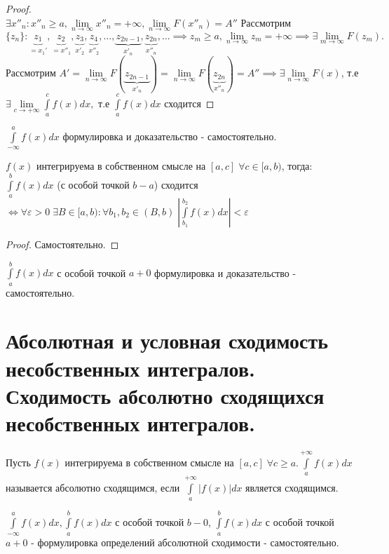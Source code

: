 \documentclass[../main.tex]{subfiles}
\begin{document}
\begin{proof}
    \\      $\exists x''_{n}: x''_{n}\geqslant a , \lim\limits_{n   \to \infty}x''_{n}=+\infty ,\lim\limits_{n  \to \infty}F(x''_{n})=A''$  Рассмотрим $\{z_{n}\}: \underbrace{z_{1}}_{=x_{1}'},\underbrace{z_{2}}_{=x''_{1}},\underbrace{z_{3}}_{x'_{2}},\underbrace{z_{4}}_{x''_{2}},\dots,\underbrace{z_{2n-1}}_{x'_{n}},\underbrace{z_{2n}}_{x''_{n}},\dots\implies z_{m}\geqslant a , \lim\limits_{n \to \infty}z_{m}=+\infty \implies \exists \lim\limits_{m    \to \infty}F(z_{m}).$ 
    Рассмотрим $A' =\lim\limits_{n  \to \infty}F(\underbrace{z_{2n-1}}_{x'_{n}})=\lim\limits_{n   \to \infty} F(\underbrace{z_{2n}}_{x''_{n}})=A'' \implies \exists \lim\limits_{n  \to \infty}F(x)$, т.е $\exists \lim\limits_{c   \to +\infty}\int\limits_{a  }^{c    } f(x)dx,$ т.е $\int\limits_{a  }^{c    } f(x)dx$ сходится
\end{proof}
$\int\limits_{-\infty   }^{a    } f(x)dx$ формулировка и доказательство - самостоятельно.
\begin{theorem}
    $f(x)$ интегрируема в собственном смысле на $[a,c]\; \forall c \in [a,b)$, тогда: $\int\limits_{a   }^{b    } f(x)dx$ (с особой точкой $b-a$) сходится $\Leftrightarrow \forall \varepsilon> 0 \; \exists B \in[a,b) : \forall b_{1},b_{2}\in (B,b) \; \left| \int\limits_{b_{1}}^{b_{2}}f(x)dx\right|<\varepsilon $
\end{theorem}
\begin{proof}
    Самостоятельно.
\end{proof}
$\int\limits_{a }^{b    } f(x)dx$ с особой точкой $a+0$ формулировка и доказательство - самостоятельно.

\section{Абсолютная и условная сходимость несобственных интегралов. Сходимость абсолютно сходящихся несобственных интегралов.}
\begin{definition}
    Пусть $f(x)$ интегрируема в собственном смысле на $[a,c] \; \forall c\geqslant a. \int\limits_{a    }^{+\infty}f(x)dx $ называется абсолютно сходящимся, если $\int\limits_{a   }^{+\infty}|f(x)|dx $ является сходящимся.
\end{definition}
$\int\limits_{-\infty   }^{a    } f(x)dx,\int\limits_{a }^{b    } f(x)dx$ с особой точкой $b-0$, $\int\limits_{a    }^{b   }f(x)dx $ с особой точкой $a+0 $ - формулировка определений абсолютной сходимости - самостоятельно.
\end{document}

